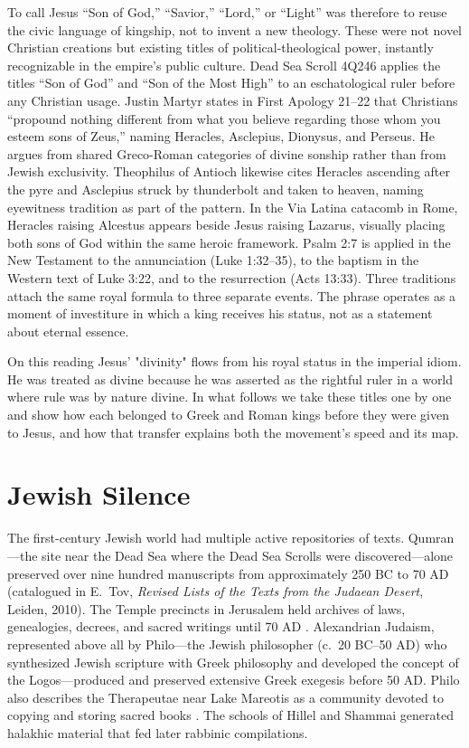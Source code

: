 To call Jesus “Son of God,” “Savior,” “Lord,” or “Light” was therefore to reuse the civic language of kingship, not to invent a new theology.
These were not novel Christian creations but existing titles of political-theological power, instantly recognizable in the empire's public culture.
Dead Sea Scroll 4Q246 applies the titles ``Son of God'' and ``Son of the Most High'' to an eschatological ruler before any Christian usage.
Justin Martyr states in First Apology 21--22 that Christians ``propound nothing different from what you believe regarding those whom you esteem sons of Zeus,'' naming Heracles, Asclepius, Dionysus, and Perseus.
He argues from shared Greco-Roman categories of divine sonship rather than from Jewish exclusivity.
Theophilus of Antioch likewise cites Heracles ascending after the pyre and Asclepius struck by thunderbolt and taken to heaven, naming eyewitness tradition as part of the pattern.
In the Via Latina catacomb in Rome, Heracles raising Alcestus appears beside Jesus raising Lazarus, visually placing both sons of God within the same heroic framework.
Psalm 2:7 is applied in the New Testament to the annunciation (Luke 1:32--35), to the baptism in the Western text of Luke 3:22, and to the resurrection (Acts 13:33).
Three traditions attach the same royal formula to three separate events.
The phrase operates as a moment of investiture in which a king receives his status, not as a statement about eternal essence.

On this reading Jesus' "divinity" flows from his royal status in the imperial idiom.
He was treated as divine because he was asserted as the rightful ruler in a world where rule was by nature divine.
In what follows we take these titles one by one and show how each belonged to Greek and Roman kings before they were given to Jesus, and how that transfer explains both the movement’s speed and its map.

\section{Jewish Silence}\label{sec:jewish-silence}

The first-century Jewish world had multiple active repositories of texts.
Qumran---the site near the Dead Sea where the Dead Sea Scrolls were discovered---alone preserved over nine hundred manuscripts from approximately 250 BC to 70 AD (catalogued in E.~Tov, \emph{Revised Lists of the Texts from the Judaean Desert}, Leiden, 2010).
The Temple precincts in Jerusalem held archives of laws, genealogies, decrees, and sacred writings until 70 AD .
Alexandrian Judaism, represented above all by Philo---the Jewish philosopher (c.~20 BC--50 AD) who synthesized Jewish scripture with Greek philosophy and developed the concept of the Logos---produced and preserved extensive Greek exegesis before 50 AD.
Philo also describes the Therapeutae near Lake Mareotis as a community devoted to copying and storing sacred books \cite{philo:contempl}.
The schools of Hillel and Shammai generated halakhic material that fed later rabbinic compilations.

